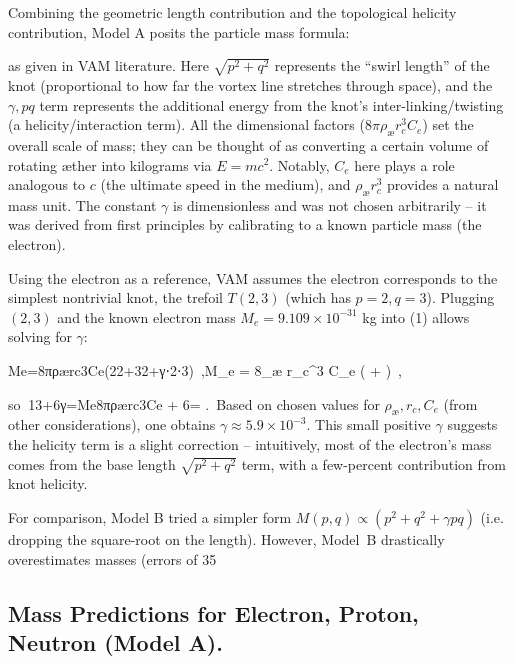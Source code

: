 Combining the geometric length contribution and the topological helicity contribution, Model A posits the particle mass formula:

 

as given in VAM literature. Here $\sqrt{p^2+q^2}$ represents the “swirl length” of the knot (proportional to how far the vortex line stretches through space), and the $\gamma,p q$ term represents the additional energy from the knot’s inter-linking/twisting (a helicity/interaction term). All the dimensional factors ($8\pi \rho_{æ} r_c^3 C_e$) set the overall scale of mass; they can be thought of as converting a certain volume of rotating æther into kilograms via $E=mc^2$. Notably, $C_e$ here plays a role analogous to $c$ (the ultimate speed in the medium), and $\rho_{æ} r_c^3$ provides a natural mass unit. The constant $\gamma$ is dimensionless and was not chosen arbitrarily – it was derived from first principles by calibrating to a known particle mass (the electron).


Using the electron as a reference, VAM assumes the electron corresponds to the simplest nontrivial knot, the trefoil $T(2,3)$ (which has $p=2,q=3$). Plugging $(2,3)$ and the known electron mass $M_e = 9.109\times10^{-31}$ kg into (1) allows solving for $\gamma$:

Me=8πρærc3Ce(22+32+γ⋅2⋅3) ,M_e = 8\pi \rho_{æ} r_c^3 C_e \Big( + \gamma {}\Big)~,

so $\ $13+6γ=Me8πρærc3Ce  + 6\gamma = .\ Based on chosen values for $\rho_{æ}, r_c, C_e$ (from other considerations), one obtains $\gamma \approx 5.9\times10^{-3}$. This small positive $\gamma$ suggests the helicity term is a slight correction – intuitively, most of the electron’s mass comes from the base length $\sqrt{p^2+q^2}$ term, with a few-percent contribution from knot helicity.


For comparison, Model B tried a simpler form $M(p,q) \propto (p^2 + q^2 + \gamma p q)$ (i.e. dropping the square-root on the length). However, Model B drastically overestimates masses (errors of 35%


\subsection*{Mass Predictions for Electron, Proton, Neutron (Model A).}

